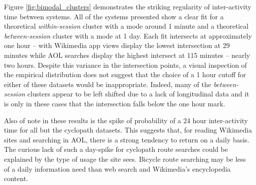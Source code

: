 Figure \ref{fig:bimodal_clusters} demonstrates the striking regularity of inter-activity time between systems.  All of the systems presented show a clear fit for a theoretical \emph{within-session} cluster with a mode around 1 minute and a theoretical \emph{between-session} cluster with a mode at 1 day.  Each fit intersects at approximately one hour -- with Wikimedia app views display the lowest intersection at 29 minutes while AOL searches display the highest intersect at 115 minutes -- nearly two hours.   Despite this variance in the intersection points, a visual inspection of the empirical distribution does not suggest that the choice of a 1 hour cutoff for either of these datasets would be inappropriate.  Indeed, many of the \emph{between-session} clusters appear to be left shifted due to a lack of longitudinal data and it is only in these cases that the intersection falls below the one hour mark.

Also of note in these results is the spike of probability of a 24 hour inter-activity time for all but the cyclopath datasets.  This suggests that, for reading Wikimedia sites and searching in AOL, there is a strong tendency to return on a daily basis.  The curious lack of such a day-spike for cyclopath route searches could be explained by the type of usage the site sees. Bicycle route searching may be less of a daily information need than web search and Wikimedia's encyclopedia content.

